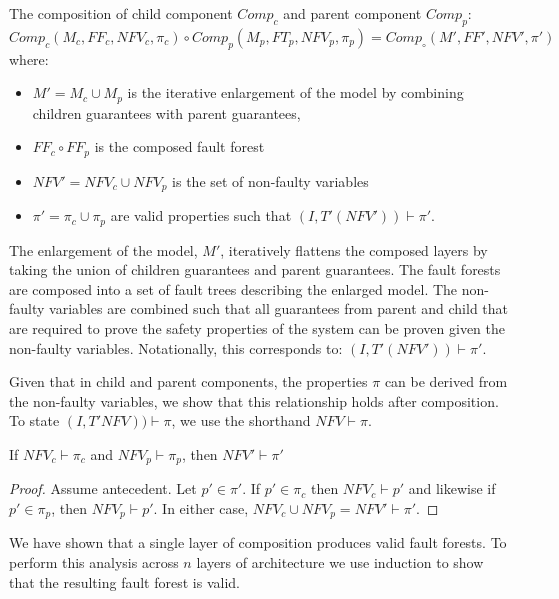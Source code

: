 \begin{definition}
The composition of child component $\mathit{Comp}_c$ and parent component $\mathit{Comp}_p$:
$Comp_c(M_c, \mathit{FF}_c, \mathit{NFV}_c, \pi_c) \circ Comp_p(M_p, \mathit{FT}_p, \mathit{NFV}_p, \pi_p) = Comp_\circ(M', \mathit{FF}', \mathit{NFV}', \pi')$ where:
\begin{itemize}[label=\textbullet]
\item $M' = M_c \cup M_p$ is the iterative enlargement of the model by combining children guarantees with parent guarantees,
\item $\mathit{FF}_c \circ \mathit{FF}_p$ is the composed fault forest
\item $\mathit{NFV}' = \mathit{NFV}_c \cup \mathit{NFV}_p$ is the set of non-faulty variables
\item $\pi' = \pi_c \cup \pi_p$ are valid properties such that $(I, T'(\mathit{NFV}')) \vdash \pi'$.
\end{itemize}
\end{definition}

The enlargement of the model, $M'$, iteratively flattens the composed layers by taking the union of children guarantees and parent guarantees. The fault forests are composed into a set of fault trees describing the enlarged model. The non-faulty variables are combined such that all guarantees from parent and child that are required to prove the safety properties of the system can be proven given the non-faulty variables. Notationally, this corresponds to: $(I, T'(\mathit{NFV}')) \vdash \pi'$. 


Given that in child and parent components, the properties $\pi$ can be derived from the non-faulty variables, we show that this relationship holds after composition. To state $(I, T'\mathit{NFV})) \vdash \pi$, we use the shorthand $\mathit{NFV} \vdash \pi$. 

\begin{theorem} If $\mathit{NFV}_c \vdash \pi_c$ and $\mathit{NFV}_p \vdash \pi_p$, then $\mathit{NFV}' \vdash \pi'$
\begin{proof}
Assume antecedent. Let $p' \in \pi'$. If $p' \in \pi_c$ then $\mathit{NFV}_c \vdash p'$ and likewise if $p' \in \pi_p$, then $\mathit{NFV}_p \vdash p'$. In either case, $\mathit{NFV}_c \cup \mathit{NFV}_p = \mathit{NFV}' \vdash \pi'$.
\end{proof}
\end{theorem} 


We have shown that a single layer of composition produces valid fault forests. To perform this analysis across $n$ layers of architecture we use induction to show that the resulting fault forest is valid. 

